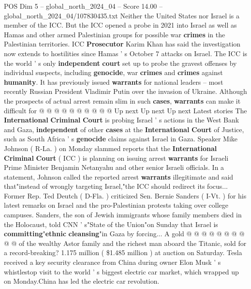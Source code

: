 \begin{textsample}{POS Dim 5 – global\_north\_2024\_04 – Score 14.00 – global\_north\_2024\_04/107830435.txt}
Neither the United States nor Israel is a member of the ICC.
But the ICC opened a probe in 2021 into Israel as well as Hamas and other armed Palestinian groups for possible war \textbf{crimes} in the Palestinian territories.
ICC \textbf{Prosecutor} Karim Khan has said the investigation now extends to hostilities since Hamas ' s October 7 attacks on Israel.
The ICC is the world ' s only \textbf{independent} \textbf{court} set up to probe the gravest offenses by individual suspects, including \textbf{genocide}, war \textbf{crimes} and \textbf{crimes} against \textbf{humanity}.
It has previously issued \textbf{warrants} for national leaders -- most recently Russian President Vladimir Putin over the invasion of Ukraine.
Although the prospects of actual arrest remain slim in such \textbf{cases}, \textbf{warrants} can make it difficult for @ @ @ @ @ @ @ @ @ @ Up next Up next Up next Latest stories The \textbf{International} \textbf{Criminal} \textbf{Court} is probing Israel ' s actions in the West Bank and Gaza, \textbf{independent} of other \textbf{cases} at the \textbf{International} \textbf{Court} of Justice, such as South Africa ' s \textbf{genocide} claims against Israel in Gaza.
Speaker Mike Johnson ( R-La. ) on Monday slammed reports that the \textbf{International} \textbf{Criminal} \textbf{Court} ( ICC ) is planning on issuing arrest \textbf{warrants} for Israeli Prime Minister Benjamin Netanyahu and other senior Israeli officials.
In a statement, Johnson called the reported arrest \textbf{warrants} illegitimate and said that"instead of wrongly targeting Israel,"the ICC should redirect its focus...
Former Rep.
Ted Deutch ( D-Fla. ) criticized Sen.
Bernie Sanders ( I-Vt. ) for his latest remarks on Israel and the pro-Palestinian protests taking over college campuses.
Sanders, the son of Jewish immigrants whose family members died in the Holocaust, told CNN ' s"State of the Union"on Sunday that Israel is \textbf{committing}"\textbf{ethnic} \textbf{cleansing}"in Gaza by forcing...
A gold @ @ @ @ @ @ @ @ @ @ of the wealthy Astor family and the richest man aboard the Titanic, sold for a record-breaking? 1.175 million ( \$1.485 million ) at auction on Saturday.
Tesla received a key security clearance from China during owner Elon Musk ' s whistlestop visit to the world ' s biggest electric car market, which wrapped up on Monday.China has led the electric car revolution.

\end{textsample}
